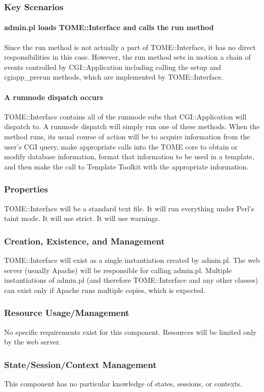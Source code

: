 \documentclass[12pt,titlepage]{article}
\begin{document}
\subsubsection{Key Scenarios}
\paragraph{admin.pl loads TOME::Interface and calls the run method}
Since the run method is not actually a part of TOME::Interface, it has no direct responsibilities in this case.  However, the run method sets in motion a chain of events controlled by CGI::Application including calling the setup and cgiapp\_prerun methods, which are implemented by TOME::Interface.
\paragraph{A runmode dispatch occurs}
TOME::Interface contains all of the runmode subs that CGI::Application will dispatch to.  A runmode dispatch will simply run one of these methods.  When the method runs, its usual course of action will be to acquire information from the user's CGI query, make appropriate calls into the TOME core to obtain or modify database information, format that information to be used in a template, and then make the call to Template Toolkit with the appropriate information.
\subsubsection{Properties}
TOME::Interface will be a standard text file.  It will run everything under Perl's taint mode.  It will use strict.  It will use warnings. 
\subsubsection{Creation, Existence, and Management}
TOME::Interface will exist as a single instantiation created by admin.pl.  The web server (usually Apache) will be responsible for calling admin.pl.  Multiple instantiations of admin.pl (and therefore TOME::Interface and any other classes) can exist only if Apache runs multiple copies, which is expected.
\subsubsection{Resource Usage/Management}
No specific requirements exist for this component.  Resources will be limited only by the web server.
\subsubsection{State/Session/Context Management}
This component has no particular knowledge of states, sessions, or contexts.
\end{document}

